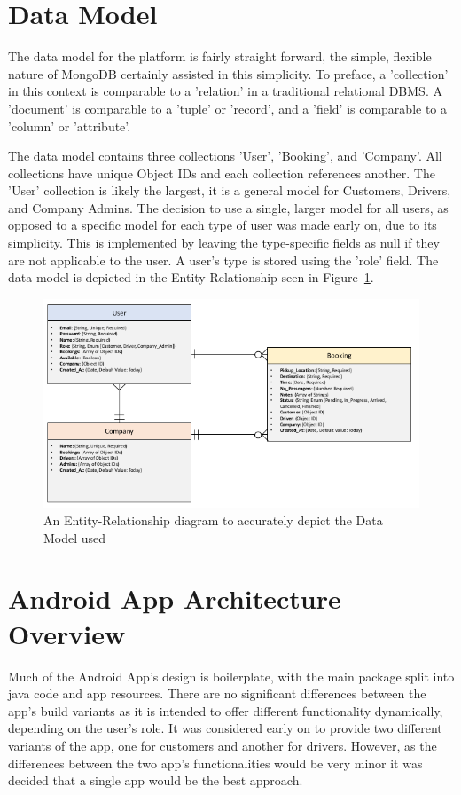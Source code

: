 \section{Data Model}
The data model for the platform is fairly straight forward, the simple, flexible nature of MongoDB certainly assisted in this simplicity. To preface, a 'collection' in this context is comparable to a 'relation' in a traditional relational DBMS. A 'document' is comparable to a 'tuple' or 'record', and a 'field' is comparable to a 'column' or 'attribute'.

The data model contains three collections 'User', 'Booking', and 'Company'. All collections have unique Object IDs and each collection references another. The 'User' collection is likely the largest, it is a general model for Customers, Drivers, and Company Admins. The decision to use a single, larger model for all users, as opposed to a specific model for each type of user was made early on, due to its simplicity. This is implemented by leaving the type-specific fields as null if they are not applicable to the user. A user's type is stored using the 'role' field. The data model is depicted in the Entity Relationship seen in Figure~\ref{fig:entity_relationship}.

\newpage

\begin{figure}[!htb]
	\centering
	\includegraphics[width=\linewidth]{Resources/img/entity_relationship.png}
	\caption{An Entity-Relationship diagram to accurately depict the Data Model used }
	\label{fig:entity_relationship}
\end{figure}

\section{Android App Architecture Overview}
Much of the Android App's design is boilerplate, with the main package split into java code and app resources. There are no significant differences between the app's build variants as it is intended to offer different functionality dynamically, depending on the user's role. It was considered early on to provide two different variants of the app, one for customers and another for drivers. However, as the differences between the two app's functionalities would be very minor it was decided that a single app would be the best approach.

